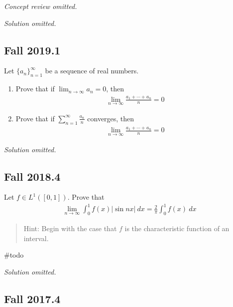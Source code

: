 \emph{Concept review omitted.}

\emph{Solution omitted.}

\hypertarget{fall-2019.1}{%
\subsection{Fall 2019.1}\label{fall-2019.1}}

Let \(\{a_n\}_{n=1}^\infty\) be a sequence of real numbers.

\begin{enumerate}
\def\labelenumi{\alph{enumi}.}
\item
  Prove that if \(\displaystyle\lim_{n\to \infty } a_n = 0\), then
  \begin{align*}
  \lim _{n \rightarrow \infty} \frac{a_{1}+\cdots+a_{n}}{n}=0
  \end{align*}
\item
  Prove that if \(\displaystyle\sum_{n=1}^{\infty} \frac{a_{n}}{n}\)
  converges, then
  \begin{align*}
  \lim _{n \rightarrow \infty} \frac{a_{1}+\cdots+a_{n}}{n}=0
  \end{align*}
\end{enumerate}

\emph{Solution omitted.}

\hypertarget{fall-2018.4}{%
\subsection{Fall 2018.4}\label{fall-2018.4}}

Let \(f\in L^1([0, 1])\). Prove that
\begin{align*}
\lim_{n \to \infty} \int_{0}^{1} f(x) {\left\lvert {\sin n x} \right\rvert} ~d x= \frac{2}{\pi} \int_{0}^{1} f(x) ~d x
\end{align*}

\begin{quote}
Hint: Begin with the case that \(f\) is the characteristic function of
an interval.
\end{quote}


\#todo

\emph{Solution omitted.}

\hypertarget{fall-2017.4}{%
\subsection{Fall 2017.4}\label{fall-2017.4}}

